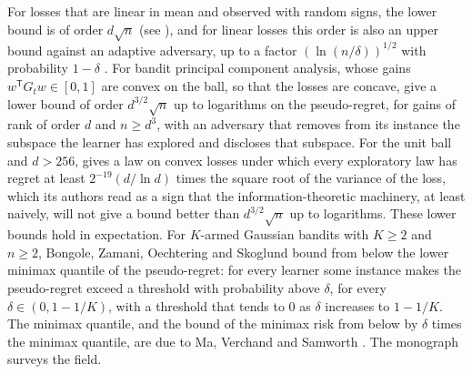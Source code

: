 \documentclass[11pt]{amsart}
\theoremstyle{definition}
\numberwithin{equation}{section}
\begin{document}
For losses that are linear in mean and observed with random signs, the lower bound is of order $d\sqrt n$ \cite[Theorem~3]{DHK08} (see \cite[Section~2.4]{Lat24}), and for linear losses this order is also an upper bound against an adaptive adversary, up to a factor $(\ln(n/\delta))^{1/2}$ with probability $1-\delta$ \cite[Theorem~5]{ZL22}. For bandit principal component analysis, whose gains $w^{\mathsf T}G_tw\in[0,1]$ are convex on the ball, so that the losses are concave, \cite[Theorem~2 and Section~4]{BOS26} give a lower bound of order $d^{3/2}\sqrt n$ up to logarithms on the pseudo-regret, for gains of rank of order $d$ and $n\ge d^3$, with an adversary that removes from its instance the subspace the learner has explored and discloses that subspace. For the unit ball and $d>256$, \cite[Theorem~12]{BLS25} gives a law on convex losses under which every exploratory law has regret at least $2^{-19}(d/\ln d)$ times the square root of the variance of the loss, which its authors read as a sign that the information-theoretic machinery, at least naively, will not give a bound better than $d^{3/2}\sqrt n$ up to logarithms. These lower bounds hold in expectation. For $K$-armed Gaussian bandits with $K\ge2$ and $n\ge2$, Bongole, Zamani, Oechtering and Skoglund \cite[Theorem~8]{BZOS26} bound from below the lower minimax quantile of the pseudo-regret: for every learner some instance makes the pseudo-regret exceed a threshold with probability above $\delta$, for every $\delta\in(0,1-1/K)$, with a threshold that tends to $0$ as $\delta$ increases to $1-1/K$. The minimax quantile, and the bound of the minimax risk from below by $\delta$ times the minimax quantile, are due to Ma, Verchand and Samworth \cite[Section~2]{MVS24}. The monograph \cite{Lat24} surveys the field.
\end{document}
